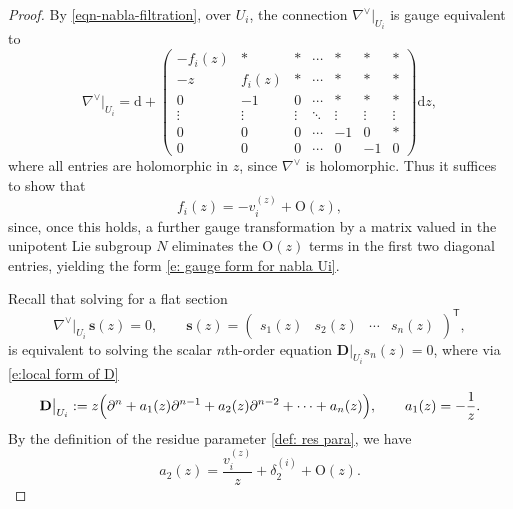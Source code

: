 \documentclass[twoside, 11pt]{article}
\numberwithin{equation}{section}
\theoremstyle{theorem}
\numberwithin{theorem}{section}
\theoremstyle{definition}
\begin{document}
\begin{proof}
By \eqref{eqn-nabla-filtration}, over $U_i$, the connection $\nabla^{\vee}\big|_{U_i}$ is gauge equivalent to
\[
\nabla^{\vee}\big|_{U_i}
=\mathrm{d}+
\begin{pmatrix}
  -f_i(z) & * & * &\cdots & * & * & * \\
  -z & f_i(z) & * &\cdots & * & * & * \\
  0 & -1 & 0 &\cdots & * & * & * \\
  \vdots & \vdots &\vdots & \ddots & \vdots & \vdots & \vdots \\
  0 & 0 & 0 &\cdots & -1 & 0 & * \\
  0 & 0 & 0 & \cdots & 0 & -1 & 0
\end{pmatrix}\mathrm{d}z,
\]
where all entries are holomorphic in $z$, since $\nabla^{\vee}$ is holomorphic.
Thus it suffices to show that
\[
f_i(z)= -v_i^{(z)}+\mathrm{O}(z),
\]
since, once this holds, a further gauge transformation by a matrix valued in the unipotent Lie subgroup $N$ eliminates the $\mathrm{O}(z)$ terms in the first two diagonal entries, yielding the form \eqref{e: gauge form for nabla Ui}.



Recall that solving for a flat section
\begin{equation}\label{e:conn flat equ}
\nabla^{\vee}\big|_{U_i}\,\boldsymbol{s}(z)=0,
\qquad 
\boldsymbol{s}(z)=
\begin{pmatrix}
s_1(z) & s_2(z) & \cdots & s_n(z)
\end{pmatrix}^{\mathsf T},
\end{equation}
is equivalent to solving the scalar $n$th-order equation
\(
\mathbf D\big|_{U_i}s_n(z)=0
\),
where via \eqref{e:local form of D}
\begin{equation}\label{e: nth order pde}
\mathbf D\big|_{U_i}
:=z\Bigl(
\partial^n+a_1(z)\partial^{n-1}
+a_2(z)\partial^{n-2}+\cdots+a_n(z)
\Bigr),
\qquad a_1(z)=-\frac{1}{z}.
\end{equation}
By the definition of the residue parameter \eqref{def: res para}, we have
\[
a_2(z)=\frac{v_i^{(z)}}{z}+\delta_2^{(i)}+\mathrm{O}(z).
\]


\end{proof}
\end{document}
